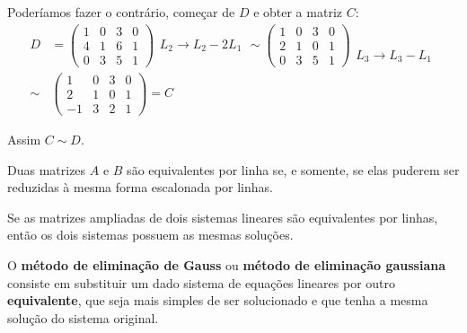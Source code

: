 \begin{exemplos}
\begin{enumerate}[label={\arabic*})]
            Poderíamos fazer o contrário, começar de $D$ e obter a matriz $C$:
            \begin{align*}
                D &= \begin{pmatrix}
                    1 & 0 & 3 & 0\\
                    4 & 1 & 6 & 1\\
                    0 & 3 & 5 & 1
                \end{pmatrix}
                \begin{array}{l}
                    \phantom{x}\\ L_2 \to L_2 - 2L_1\\\phantom{x}
                \end{array} \sim
                \begin{pmatrix}
                    1 & 0 & 3 & 0\\
                    2 & 1 & 0 & 1\\
                    0 & 3 & 5 & 1
                \end{pmatrix}
                \begin{array}{l}
                    \phantom{x}\\ \phantom{x}\\ L_3 \to L_3 - L_1
                \end{array}\\ \sim
                  &\begin{pmatrix}
                    1 & 0 & 3 & 0\\
                    2 & 1 & 0 & 1\\
                    -1 & 3 & 2 & 1
                \end{pmatrix} = C
            \end{align*}

            Assim $C \sim D$.
    \end{enumerate}
\end{exemplos}
\begin{teorema}
    Duas matrizes $A$ e $B$ são equivalentes por linha se, e somente, se elas puderem ser reduzidas à mesma forma escalonada por linhas.
\end{teorema}

\begin{teorema}
    Se as matrizes ampliadas de dois sistemas lineares são equivalentes por linhas, então os dois sistemas possuem as mesmas soluções.
\end{teorema}

O \textbf{método de eliminação de Gauss} ou \textbf{método de eliminação gaussiana} consiste em substituir um dado sistema de equações lineares  por outro \textbf{equivalente}, que seja mais simples de ser solucionado e que tenha a mesma solução do sistema original.


